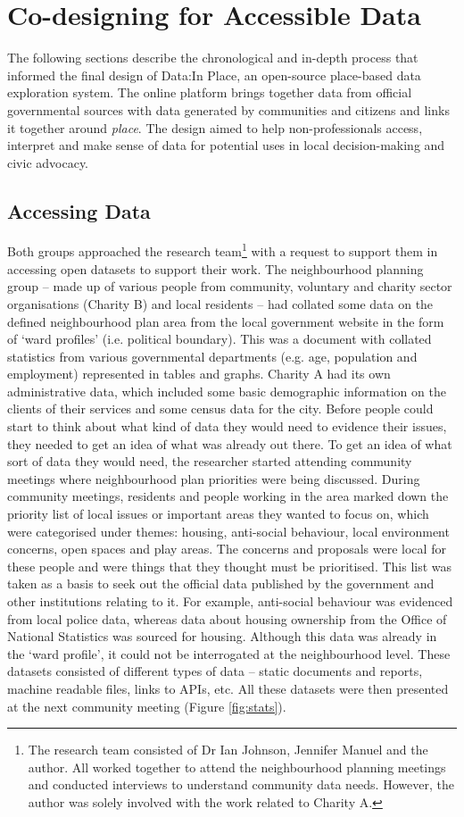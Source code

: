 \section{Co-designing for Accessible Data}
\label{sec:data_dprocess}
The following sections describe the chronological and in-depth process that informed the final design of Data:In Place, an open-source place-based data exploration system. The online platform brings together data from official governmental sources with data generated by communities and citizens and links it together around \textit{place}. The design aimed to help non-professionals access, interpret and make sense of data for potential uses in local decision-making and civic advocacy.

\subsection{Accessing Data}
\label{sec:accdata}
Both groups approached the research team\footnote{The research team consisted of Dr Ian Johnson, Jennifer Manuel and the author. All worked together to attend the neighbourhood planning meetings and conducted interviews to understand community data needs. However, the author was solely involved with the work related to Charity A.} with a request to support them in accessing open datasets to support their work. The neighbourhood planning group -- made up of various people from community, voluntary and charity sector organisations (Charity B) and local residents -- had collated some data on the defined neighbourhood plan area from the local government website in the form of `ward profiles' (i.e. political boundary). This was a document with collated statistics from various governmental departments (e.g. age, population and employment) represented in tables and graphs. Charity A had its own administrative data, which included some basic demographic information on the clients of their services and some census data for the city. Before people could start to think about what kind of data they would need to evidence their issues, they needed to get an idea of what was already out there. To get an idea of what sort of data they would need, the researcher started attending community meetings where neighbourhood plan priorities were being discussed. During community meetings, residents and people working in the area marked down the priority list of local issues or important areas they wanted to focus on, which were categorised under themes: housing, anti-social behaviour, local environment concerns, open spaces and play areas. The concerns and proposals were local for these people and were things that they thought must be prioritised. This list was taken as a basis to seek out the official data published by the government and other institutions relating to it. For example, anti-social behaviour was evidenced from local police data, whereas data about housing ownership from the Office of National Statistics was sourced for housing. Although this data was already in the `ward profile', it could not be interrogated at the neighbourhood level. These datasets consisted of different types of data -- static documents and reports, machine readable files, links to APIs, etc. All these datasets were then presented at the next community meeting (Figure \ref{fig:stats}).

